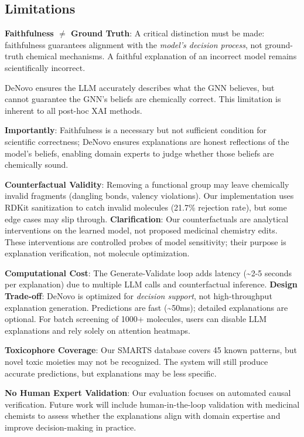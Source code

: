 \documentclass[conference]{IEEEtran}
\begin{document}
\subsection{Limitations}

\textbf{Faithfulness $\neq$ Ground Truth}: A critical distinction must be made: faithfulness guarantees alignment with the \textit{model's decision process}, not ground-truth chemical mechanisms. A faithful explanation of an incorrect model remains scientifically incorrect. 

DeNovo ensures the LLM accurately describes what the GNN believes, but cannot guarantee the GNN's beliefs are chemically correct. This limitation is inherent to all post-hoc XAI methods. 

\textbf{Importantly}: Faithfulness is a necessary but not sufficient condition for scientific correctness; DeNovo ensures explanations are honest reflections of the model's beliefs, enabling domain experts to judge whether those beliefs are chemically sound.

\textbf{Counterfactual Validity}: Removing a functional group may leave chemically invalid fragments (dangling bonds, valency violations). Our implementation uses RDKit sanitization to catch invalid molecules (21.7\% rejection rate), but some edge cases may slip through. \textbf{Clarification}: Our counterfactuals are analytical interventions on the learned model, not proposed medicinal chemistry edits. These interventions are controlled probes of model sensitivity; their purpose is explanation verification, not molecule optimization.

\textbf{Computational Cost}: The Generate-Validate loop adds latency (\textasciitilde2-5 seconds per explanation) due to multiple LLM calls and counterfactual inference. \textbf{Design Trade-off}: DeNovo is optimized for \textit{decision support}, not high-throughput explanation generation. Predictions are fast (\textasciitilde50ms); detailed explanations are optional. For batch screening of 1000+ molecules, users can disable LLM explanations and rely solely on attention heatmaps.

\textbf{Toxicophore Coverage}: Our SMARTS database covers 45 known patterns, but novel toxic moieties may not be recognized. The system will still produce accurate predictions, but explanations may be less specific.

\textbf{No Human Expert Validation}: Our evaluation focuses on automated causal verification. Future work will include human-in-the-loop validation with medicinal chemists to assess whether the explanations align with domain expertise and improve decision-making in practice.
\end{document}
